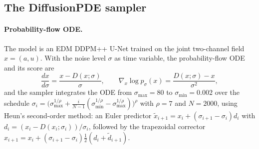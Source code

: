 \subsection{The DiffusionPDE sampler}
\paragraph{Probability-flow ODE.} The model is an EDM \citep{karras2022edm} DDPM++ U-Net trained on the joint two-channel field $x=(a,u)$. With the noise level $\sigma$ as time variable, the probability-flow ODE and its score are
\begin{equation}
  \frac{dx}{d\sigma} = \frac{x - D(x;\sigma)}{\sigma}, \qquad \nabla_x\log p_\sigma(x) = \frac{D(x;\sigma)-x}{\sigma^2},
\end{equation}
and the sampler integrates the ODE from $\sigma_{\max}=80$ to $\sigma_{\min}=0.002$ over the schedule $\sigma_i = \big(\sigma_{\max}^{1/\rho}+\tfrac{i}{N-1}(\sigma_{\min}^{1/\rho}-\sigma_{\max}^{1/\rho})\big)^{\rho}$ with $\rho=7$ and $N=2000$, using Heun's second-order method: an Euler predictor $\tilde x_{i+1} = x_i + (\sigma_{i+1}-\sigma_i)d_i$ with $d_i = (x_i-D(x_i;\sigma_i))/\sigma_i$, followed by the trapezoidal corrector $x_{i+1} = x_i + (\sigma_{i+1}-\sigma_i)\tfrac12(d_i+\tilde d_{i+1})$.

